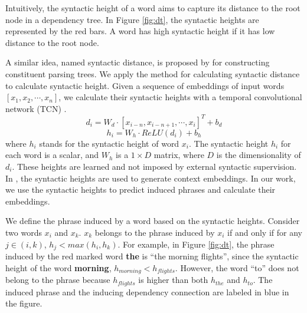 \documentclass[11pt,a4paper]{article}
\begin{document}
Intuitively, the syntactic height of a word aims to capture its distance to the root node in a dependency tree. In Figure \ref{fig:dt}, the syntactic heights are represented by the red bars. A word has high syntactic height if it has low distance to the root node.

A similar idea, named syntactic distance, is proposed by \citet{shen2017neural} for constructing constituent parsing trees. We apply the method for calculating syntactic distance to calculate syntactic height. Given a sequence of embeddings of input words $ [x_1, x_2, \cdots, x_n] $, we calculate their syntactic heights with a temporal convolutional network (TCN) \cite{bai2018empirical}. 
\begin{equation}
d_i = W_d \cdot [x_{i - n}, x_{i - n + 1}, \cdots, x_i]^T + b_d
\end{equation}
\begin{equation}
h_i = W_h \cdot ReLU(d_i) + b_h
\end{equation}
where $h_i$ stands for the syntactic height of word $x_i$. The syntactic height $h_i$ for each word is a scalar, and $W_h$ is a $1 \times D$ matrix, where $D$ is the dimensionality of $d_i$. These heights are learned and not imposed by external syntactic supervision. 
In \citet{shen2017neural}, the syntactic heights are used to generate context embeddings. In our work, we use the syntactic heights to predict induced phrases and calculate their embeddings.

We define the phrase induced by a word based on the syntactic heights. Consider two words $x_i$ and $x_k$. $x_k$ belongs to the phrase induced by $x_i$ if and only if for any $j \in (i, k)$, $h_j < max(h_i, h_k)$. For example, in Figure \ref{fig:dt}, the phrase induced by the red marked word \textbf{the} is ``the morning flights'', since the syntactic height of the word \textbf{morning}, $h_{morning} < h_{flights}$. However, the word ``to'' does not belong to the phrase because $h_{flights}$ is higher than both $h_{the}$ and $h_{to}$. The induced phrase and the inducing dependency connection are labeled in blue in the figure.
\end{document}
